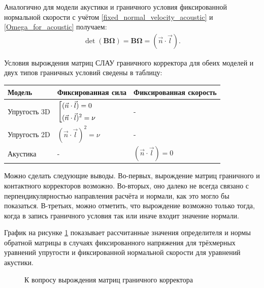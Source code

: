Аналогично для модели акустики и граничного условия фиксированной 
нормальной скорости с учётом \ref{fixed_normal_velocity_acoustic} 
и \ref{Omega_for_acoustic} получаем:
\begin{eqnarray}
	\det (\mathbf{B} \mathbf{\Omega}) = \mathbf{B} \mathbf{\Omega} = (\vec{n} \cdot \vec{l}).
\end{eqnarray}

Условия вырождения матриц СЛАУ граничного корректора для обеих моделей и 
двух типов граничных условий сведены в таблицу:
\begin{center}
    \begin{tabular}{ | l | l | l | }
    \hline
    Модель & Фиксированная сила & Фиксированная скорость \\ \hline
    Упругость 3D & $\left[ \begin{gathered} (\vec{n} \cdot \vec{l}) = 0  \hfill \\ (\vec{n} \cdot \vec{l})^2 = \nu \hfill \\ \end{gathered} \right.$
 & - \\ \hline
    Упругость 2D & $(\vec{n} \cdot \vec{l})^2 = \nu$ & -  \\ \hline
    Акустика & - & $(\vec{n} \cdot \vec{l}) = 0$     \\ \hline
    \end{tabular}
\end{center}

Можно сделать следующие выводы. 
Во-первых, вырождение матриц граничного и контактного корректоров возможно. 
Во-вторых, оно далеко не всегда связано с перпендикулярностью направления 
расчёта и нормали, как это могло бы показаться. 
В-третьих, можно отметить, что вырождение возможно только тогда, 
когда в запись граничного условия так или иначе входит значение нормали.

График на рисунке \ref{pic:corrector_conditional} показывает рассчитанные 
значения определителя и нормы обратной матрицы в случаях 
фиксированного напряжения для трёхмерных уравнений упругости и 
фиксированной нормальной скорости для уравнений акустики. 
\begin{figure}[H]
	\caption{К вопросу вырождения матриц граничного корректора}
	\label{pic:corrector_conditional}
\end{figure}

